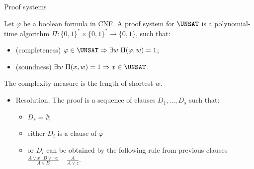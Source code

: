 \begin{frame}{Proof systems}

    \begin{definition}
        Let $\varphi$ be a boolean formula in CNF. A proof system for $\UNSAT$ is a polynomial-time algorithm $\Pi: \{0,
        1\}^* \times \{0, 1\}^* \rightarrow \{0, 1\}$, such that: 
        \begin{itemize}
            \item (completeness) $\varphi \in \UNSAT \Rightarrow \exists w ~ \Pi(\varphi, w) = 1$;
            \item (soundness) $\exists w ~ \Pi(x, w) = 1 \Rightarrow x \in \UNSAT$.
        \end{itemize}
    \end{definition}

    The complexity measure is the length of shortest $w$.
    \pause

    \vspace{0.3cm}

    \begin{itemize}
        \item Resolution. The proof is a sequence of clauses $D_1, \dots, D_s$ such that:
            \begin{itemize}
                \item $D_s = \emptyset$;
                \item either $D_i$ is a clause of $\varphi$
                \item or $D_i$ can be obtained by the following rule from previous clauses $\frac{A \lor
                    x ~~~ B \lor \neg x}{A \lor B} ~~~~~ \frac{A}{A \lor z}$.
            \end{itemize}
    \end{itemize}
\end{frame}

